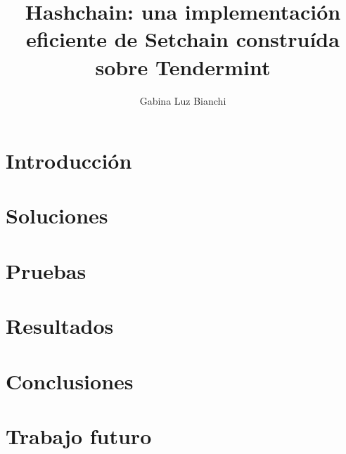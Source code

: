 \documentclass[12pt, oneside]{book}
\title{Hashchain: una implementación eficiente de Setchain construída sobre Tendermint}
\author{Gabina Luz Bianchi}
\begin{document}
\maketitle



\tableofcontents{}

\chapter{Introducción}





\chapter{Soluciones}


\chapter{Pruebas}

\chapter{Resultados}

\chapter{Conclusiones}

\chapter{Trabajo futuro}






% 




% 


% 


% 



% 
\end{document}
